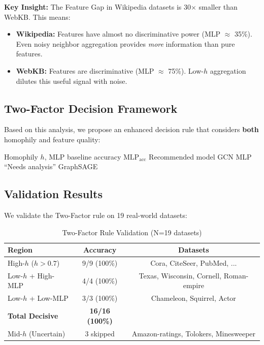 \textbf{Key Insight:} The Feature Gap in Wikipedia datasets is 30$\times$ smaller than WebKB. This means:
\begin{itemize}
    \item \textbf{Wikipedia:} Features have almost no discriminative power (MLP $\approx$ 35\%). Even noisy neighbor aggregation provides \textit{more} information than pure features.
    \item \textbf{WebKB:} Features are discriminative (MLP $\approx$ 75\%). Low-$h$ aggregation dilutes this useful signal with noise.
\end{itemize}

\subsection{Two-Factor Decision Framework}

Based on this analysis, we propose an enhanced decision rule that considers \textbf{both} homophily and feature quality:

\begin{algorithm}[h]
\caption{Two-Factor Model Selection}
\label{alg:two_factor}
\begin{algorithmic}[1]
\REQUIRE Homophily $h$, MLP baseline accuracy $\text{MLP}_{\text{acc}}$
\ENSURE Recommended model
    \RETURN GCN 
        \RETURN MLP 
    \ELSE
        \RETURN ``Needs analysis'' 
    \ENDIF
\ELSE
    \RETURN GraphSAGE 
\ENDIF
\end{algorithmic}
\end{algorithm}

\subsection{Validation Results}

We validate the Two-Factor rule on 19 real-world datasets:

\begin{table}[h]
\centering
\caption{Two-Factor Rule Validation (N=19 datasets)}
\label{tab:two_factor_validation}
\small
\begin{tabular}{@{}lcc@{}}
\toprule
\textbf{Region} & \textbf{Accuracy} & \textbf{Datasets} \\
\midrule
High-$h$ ($h > 0.7$) & 9/9 (100\%) & Cora, CiteSeer, PubMed, ... \\
Low-$h$ + High-MLP & 4/4 (100\%) & Texas, Wisconsin, Cornell, Roman-empire \\
Low-$h$ + Low-MLP & 3/3 (100\%) & Chameleon, Squirrel, Actor \\
\midrule
\textbf{Total Decisive} & \textbf{16/16 (100\%)} & \\
\midrule
Mid-$h$ (Uncertain) & 3 skipped & Amazon-ratings, Tolokers, Minesweeper \\
\bottomrule
\end{tabular}
\end{table}


